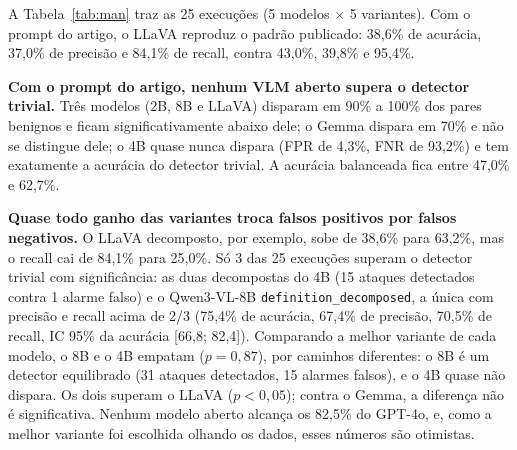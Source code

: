 \documentclass[journal,onecolumn]{IEEEtran}
\begin{document}
A Tabela~\ref{tab:man} traz as 25 execuções (5 modelos $\times$ 5 variantes). Com o prompt do artigo, o
LLaVA reproduz o padrão publicado: 38,6\% de acurácia, 37,0\% de precisão e 84,1\% de recall, contra
43,0\%, 39,8\% e 95,4\%.

\textbf{Com o prompt do artigo, nenhum VLM aberto supera o detector trivial.} Três modelos (2B, 8B e
LLaVA) disparam em 90\% a 100\% dos pares benignos e ficam significativamente abaixo dele; o Gemma
dispara em 70\% e não se distingue dele; o 4B quase nunca dispara (FPR de 4,3\%, FNR de 93,2\%) e tem
exatamente a acurácia do detector trivial. A acurácia balanceada fica entre 47,0\% e 62,7\%.

\textbf{Quase todo ganho das variantes troca falsos positivos por falsos negativos.} O LLaVA decomposto,
por exemplo, sobe de 38,6\% para 63,2\%, mas o recall cai de 84,1\% para 25,0\%. Só 3 das 25 execuções
superam o detector trivial com significância: as duas decompostas do 4B (15 ataques detectados contra 1
alarme falso) e o Qwen3-VL-8B \texttt{definition\_decomposed}, a única com precisão e recall acima de
2/3 (75,4\% de acurácia, 67,4\% de precisão, 70,5\% de recall, IC 95\% da acurácia [66,8; 82,4]).
Comparando a melhor variante de cada modelo, o 8B e o 4B empatam ($p=0{,}87$), por caminhos
diferentes: o 8B é um detector equilibrado (31 ataques detectados, 15 alarmes falsos), e o 4B quase
não dispara. Os dois superam o LLaVA ($p<0{,}05$); contra o Gemma, a diferença não é significativa.
Nenhum modelo aberto alcança os 82,5\% do GPT-4o, e, como a melhor variante foi escolhida olhando os
dados, esses números são otimistas.
\end{document}
